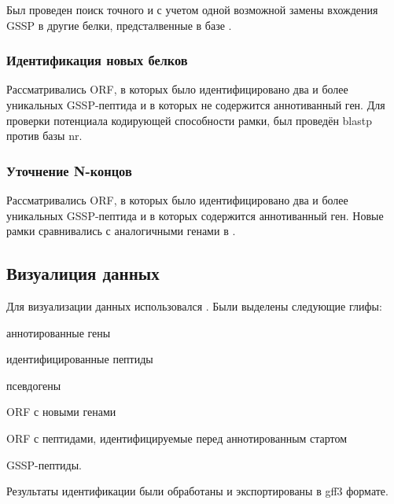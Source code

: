 Был проведен поиск точного и с учетом одной возможной замены вхождения GSSP в другие белки, предсталвенные в базе .  


\subsubsection{Идентификация новых белков}
Рассматривались ORF, в которых было идентифицировано два и более уникальных GSSP-пептида и в которых не содержится аннотиванный ген. Для проверки потенциала кодирующей способности рамки, был проведён blastp против базы nr. 

\subsubsection{Уточнение N-концов}
Рассматривались ORF, в которых было идентифицировано два и более уникальных GSSP-пептида и в которых содержится аннотиванный ген. Новые рамки сравнивались с аналогичными генами в .


\subsection{Визуалиция данных}
Для визуализации данных использовался . Были выделены следующие глифы: 
\begin{inparaenum}
    \item аннотированные гены
    \item идентифицированные пептиды
    \item псевдогены
    \item ORF с новыми генами
    \item ORF с пептидами, идентифицируемые перед аннотированным стартом
    \item GSSP-пептиды.
\end{inparaenum} Результаты идентификации были обработаны и экспортированы в gff3 формате.


